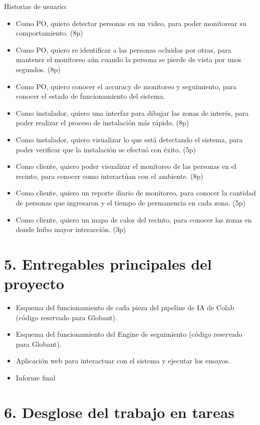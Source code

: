\documentclass[11pt]{charter}
\begin{document}
Historias de usuario:
\begin{itemize}
\item Como PO, quiero detectar personas en un video, para poder monitorear su comportamiento. (8p)
\item Como PO, quiero re identificar a las personas ocluidas por otras, para mantener el monitoreo aún cuando la persona se pierde de vista por unos segundos. (8p)
\item Como PO, quiero conocer el accuracy de monitoreo y seguimiento, para conocer el estado de funcionamiento del sistema.
\item Como instalador, quiero una interfaz para dibujar las zonas de interés, para poder realizar el proceso de instalación más rápido. (8p)
\item Como instalador, quiero visualizar lo que está detectando el sistema, para poder verificar que la instalación se efectuó con éxito. (5p)
\item Como cliente, quiero poder visualizar el monitoreo de las personas en el recinto, para conocer como interactúan con el ambiente. (8p)
\item Como cliente, quiero un reporte diario de monitoreo, para conocer la cantidad de personas que ingresaron y el tiempo de permanencia en cada zona. (5p)
\item Como cliente, quiero un mapa de calor del recinto, para conocer las zonas en donde hubo mayor interacción. (3p)
\end{itemize}

\section{5. Entregables principales del proyecto}
\label{sec:entregables}

\begin{itemize}
\item Esquema del funcionamiento de cada pieza del pipeline de IA de Colab (código reservado para Globant).
\item Esquema del funcionamiento del Engine de seguimiento (código reservado para Globant).
\item Aplicación web para interactuar con el sistema y ejecutar los ensayos.
\item Informe final
\end{itemize}

\newpage

\section{6. Desglose del trabajo en tareas}
\label{sec:wbs}
\end{document}
